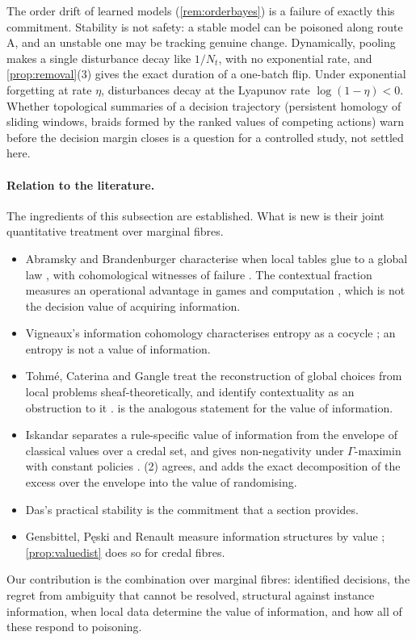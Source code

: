 \documentclass[11pt]{article}
\theoremstyle{definition}\newtheorem{definition}[theorem]{Definition}\newtheorem{remark}[theorem]{Remark}\newtheorem{example}[theorem]{Example}\newtheorem{problem}[theorem]{Open problem}\crefname{problem}{Problem}{Problems}
\newcommand{\Peski}{P{\fontencoding{T1}\selectfont\k{e}}ski}
\begin{document}
The order drift of learned models (\cref{rem:orderbayes}) is a failure of exactly this commitment. Stability is not safety: a stable model can be poisoned along route A, and an unstable one may be tracking genuine change. Dynamically, pooling makes a single disturbance decay like $1/N_t$, with no exponential rate, and \cref{prop:removal}(3) gives the exact duration of a one-batch flip. Under exponential forgetting at rate $\eta$, disturbances decay at the Lyapunov rate $\log(1-\eta)<0$. Whether topological summaries of a decision trajectory (persistent homology of sliding windows, braids formed by the ranked values of competing actions) warn before the decision margin closes is a question for a controlled study, not settled here.
\paragraph{Relation to the literature.} The ingredients of this subsection are established. What is new is their joint quantitative treatment over marginal fibres.
\begin{itemize}
\item Abramsky and Brandenburger characterise when local tables glue to a global law \cite{AbramskyBrandenburger2011}, with cohomological witnesses of failure \cite{AbramskyMansfieldBarbosa2012}. The contextual fraction measures an operational advantage in games and computation \cite{AbramskyBarbosaMansfield2017}, which is not the decision value of acquiring information.
\item Vigneaux's information cohomology characterises entropy as a cocycle \cite{Vigneaux2020}; an entropy is not a value of information.
\item Tohm\'e, Caterina and Gangle treat the reconstruction of global choices from local problems sheaf-theoretically, and identify contextuality as an obstruction to it \cite{TohmeCaterinaGangle2017}.  is the analogous statement for the value of information.
\item Iskandar separates a rule-specific value of information from the envelope of classical values over a credal set, and gives non-negativity under $\Gamma$-maximin with constant policies \cite{Iskandar2026}. (2) agrees, and adds the exact decomposition of the excess over the envelope into the value of randomising.
\item Das's practical stability \cite{Das2023} is the commitment that a section provides.
\item Gensbittel, \Peski{} and Renault measure information structures by value \cite{GensbittelPeskiRenault2022}; \cref{prop:valuedist} does so for credal fibres.
\end{itemize}
Our contribution is the combination over marginal fibres: identified decisions, the regret from ambiguity that cannot be resolved, structural against instance information, when local data determine the value of information, and how all of these respond to poisoning.
\end{document}
